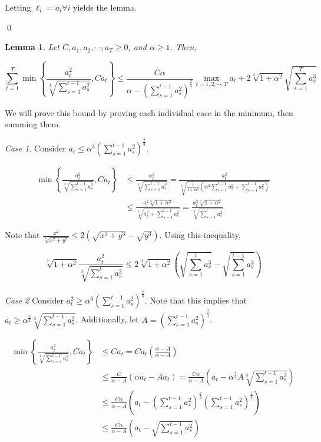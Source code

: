 \documentclass{article}
\newtheorem{lemma}[theorem]{Lemma}
\begin{document}
Letting $\ell_i = a_i \forall i$ yields the lemma.

\qed

\begin{lemma}
  Let $C, a_1, a_2, \cdots, a_T \geq 0$, and $\alpha \geq 1$. Then,

  \[
    \sum\limits_{t=1}^T \min \left\{ \frac{a_{t}^2}{\sqrt[3]{\sum\limits_{s=1}^{t-1} a_{s}^2}}, C a_t\right\} \leq
    \frac{C \alpha}{\alpha - \left(\sum\limits_{s=1}^{t-1} a_{s}^2\right)^\frac{2}{3}} \max\limits_{t=1,2,\cdots,T} a_t
    + 2\sqrt[3]{1 + \alpha^2} \sqrt{\sum\limits_{s=1}^T a_{s}^3}
  \]
\end{lemma}

\proof We will prove this bound by proving each individual case in the minimum, then summing them.

\emph{Case 1}. Consider $a_t \leq \alpha^3 \left(\sum\limits_{s=1}^{t-1} a_s^2\right)^\frac{2}{3}$.

\begin{align*}
  \min \left\{ \frac{a_{t}^2}{\sqrt[3]{\sum\limits_{s=1}^{t-1} a_{s}^2}}, C a_t \right\} 
  &\leq \frac{\alpha_{t}^2}{\sqrt[3]{\sum\limits_{s=1}^{t-1}a_{s}^2}} =
  \frac{a_{t}^2}{\sqrt[3]{\frac{1}{1+\alpha^2}\left(\alpha^2 \sum\limits_{s=1}^{t-1} a_{s}^2 +
  \sum\limits_{s=1}^{t-1} a_{s}^2 \right)}} \\
  &\leq \frac{a_{t}^2 \sqrt[3]{1 + \alpha^2}}{\sqrt[3]{a_{t}^2 + \sum\limits_{s=1}^{t-1} a_{s}^2}} = \frac{a_{t}^2
  \sqrt[3]{1 + \alpha^2}}{\sqrt[3]{\sum\limits_{s=1}^t a_{s}^2}}
\end{align*}

Note that $\frac{x^2}{\sqrt[3]{x^2 + y^2}} \leq 2(\sqrt{x^3 + y^3} - \sqrt{y^3})$. Using this inequality,

\[
  \sqrt[3]{1 + \alpha^2} \frac{a_{t}^2}{\sqrt[3]{\sum\limits_{s=1}^t a_{s}^2}} \leq 2 \sqrt[3]{1 +
  \alpha^2}\left(\sqrt{\sum\limits_{s=1}^t a_{s}^3} - \sqrt{\sum\limits_{s=1}^{t-1} a_{s}^3}\right)
\]

\emph{Case 2} Consider $a_{t}^2 \geq \alpha^3 \left(\sum\limits_{s=1}^{t-1} a_{s}^2\right)^\frac{2}{3}$. Note that this
implies that $a_t \geq \alpha^\frac{3}{2} \sqrt[3]{\sum\limits_{s=1}^{t-1} a_{s}^2}$. Additionally, let 
$A = \left( \sum\limits_{s=1}^{t-1} a_{s}^2 \right)^\frac{2}{3}$.


\begin{align*}
  \min \left\{ \frac{a_{t}^2}{\sqrt[3]{\sum\limits_{s=1}^{t-1} a_{s}^2}}, C a_t \right\}
  &\leq C a_t = C a_t \left(\frac{\alpha - A}{\alpha -A}\right) \\
  &\leq \frac{C}{\alpha - A}\left(\alpha a_t - A a_t\right) = \frac{C \alpha}{\alpha - A}\left(a_t - \alpha^\frac{1}{2}
    A \sqrt[3]{\sum\limits_{s=1}^{t-1} a_{s}^2}\right) \\
  &\leq \frac{C \alpha}{\alpha - A}\left(a_t - \left( \sum\limits_{s=1}^{t-1} a_{s}^2 \right)^\frac{2}{3}
  \left(\sum\limits_{s=1}^{t-1} a_{s}^2\right)^\frac{1}{3}\right) \\
  &\leq \frac{C \alpha}{\alpha - A}\left(a_t - \sqrt{\sum\limits_{s=1}^{t-1} a_{s}^2}\right)
\end{align*}
\end{document}
